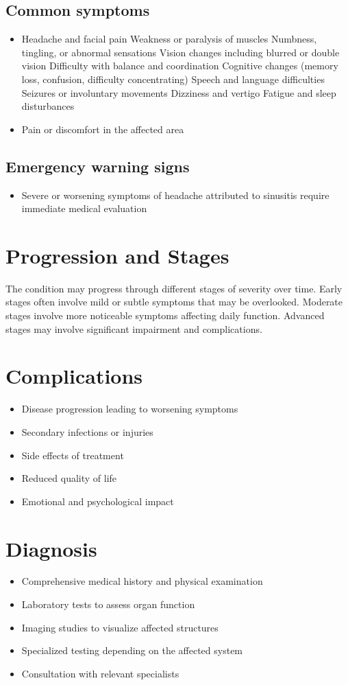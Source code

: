 \subsection{Common symptoms}
\begin{itemize}[noitemsep]
  \item Headache and facial pain Weakness or paralysis of muscles Numbness, tingling, or abnormal sensations Vision changes including blurred or double vision Difficulty with balance and coordination Cognitive changes (memory loss, confusion, difficulty concentrating) Speech and language difficulties Seizures or involuntary movements Dizziness and vertigo Fatigue and sleep disturbances
  \item Pain or discomfort in the affected area
  \end{itemize}
\subsection{Emergency warning signs}
\begin{itemize}[noitemsep]
  \item Severe or worsening symptoms of headache attributed to sinusitis require immediate medical evaluation
\end{itemize}
\section{Progression and Stages}
The condition may progress through different stages of severity over time. Early stages often involve mild or subtle symptoms that may be overlooked. Moderate stages involve more noticeable symptoms affecting daily function. Advanced stages may involve significant impairment and complications.
\section{Complications}
\begin{itemize}[noitemsep]
  \item Disease progression leading to worsening symptoms
  \item Secondary infections or injuries
  \item Side effects of treatment
  \item Reduced quality of life
  \item Emotional and psychological impact
\end{itemize}
\section{Diagnosis}
\begin{itemize}[noitemsep]
  \item Comprehensive medical history and physical examination
  \item Laboratory tests to assess organ function
  \item Imaging studies to visualize affected structures
  \item Specialized testing depending on the affected system
  \item Consultation with relevant specialists
\end{itemize}
